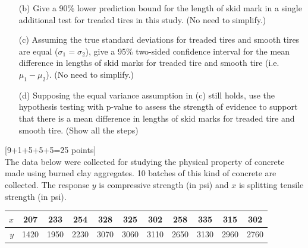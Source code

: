 \documentclass[11pt]{article}
\begin{document}
{\begin{enumerate}
\vskip 4.5cm

\item[(b)] Give a 90\% lower prediction bound for the length of skid mark in a single additional test for treaded tires in this study. (No need to simplify.)

\hfill {}

\vskip 5cm

\item[(c)] Assuming the true standard deviations for treaded tires and smooth tires are equal ($\sigma_1 = \sigma_2$), give a 95\% two-sided confidence interval for the mean difference in lengths of skid marks for treaded tire and smooth tire (i.e. $\mu_1 - \mu_2$). (No need to simplify.)

\hfill {}

 \vskip 7cm

\item[(d)] Supposing the equal variance assumption in (c) still holds, use the hypothesis testing with p-value to assess the strength of evidence to support that
there is a mean difference in lengths of skid marks for treaded tire and smooth tire. (Show all the steps)

\end{enumerate}

\newpage


\hfill[9+1+5+5+5=25 points] \\
%
The data below were collected for studying the physical property of concrete made using burned clay aggregates. 10 batches of this kind of concrete are collected. The response
$y$ is compressive strength (in psi) and $x$ is splitting tensile strength (in psi).\\
%

\begin{tabular}{|r|c c c c c c c c c c|}
  \hline
  $x$ & 207 & 233 & 254 & 328 & 325 & 302 & 258 & 335 & 315 & 302 \\
  \hline
  $y$ & 1420 & 1950 & 2230 & 3070 & 3060 & 3110 & 2650 & 3130 & 2960 & 2760 \\
  \hline
\end{tabular}
%
\vskip 0.5cm

}
\end{document}
